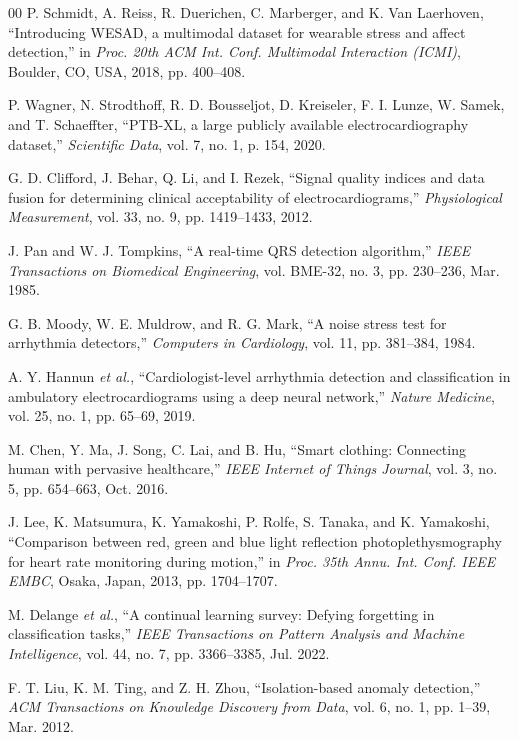 \documentclass{ieeeaccess}
\begin{document}
\begin{thebibliography}{00}
P. Schmidt, A. Reiss, R. Duerichen, C. Marberger, and K. Van Laerhoven, ``Introducing WESAD, a multimodal dataset for wearable stress and affect detection,'' in \textit{Proc. 20th ACM Int. Conf. Multimodal Interaction (ICMI)}, Boulder, CO, USA, 2018, pp. 400--408.

P. Wagner, N. Strodthoff, R. D. Bousseljot, D. Kreiseler, F. I. Lunze, W. Samek, and T. Schaeffter, ``PTB-XL, a large publicly available electrocardiography dataset,'' \textit{Scientific Data}, vol. 7, no. 1, p. 154, 2020.

G. D. Clifford, J. Behar, Q. Li, and I. Rezek, ``Signal quality indices and data fusion for determining clinical acceptability of electrocardiograms,'' \textit{Physiological Measurement}, vol. 33, no. 9, pp. 1419--1433, 2012.

J. Pan and W. J. Tompkins, ``A real-time QRS detection algorithm,'' \textit{IEEE Transactions on Biomedical Engineering}, vol. BME-32, no. 3, pp. 230--236, Mar. 1985.

G. B. Moody, W. E. Muldrow, and R. G. Mark, ``A noise stress test for arrhythmia detectors,'' \textit{Computers in Cardiology}, vol. 11, pp. 381--384, 1984.

A. Y. Hannun \textit{et al.}, ``Cardiologist-level arrhythmia detection and classification in ambulatory electrocardiograms using a deep neural network,'' \textit{Nature Medicine}, vol. 25, no. 1, pp. 65--69, 2019.

M. Chen, Y. Ma, J. Song, C. Lai, and B. Hu, ``Smart clothing: Connecting human with pervasive healthcare,'' \textit{IEEE Internet of Things Journal}, vol. 3, no. 5, pp. 654--663, Oct. 2016.

J. Lee, K. Matsumura, K. Yamakoshi, P. Rolfe, S. Tanaka, and K. Yamakoshi, ``Comparison between red, green and blue light reflection photoplethysmography for heart rate monitoring during motion,'' in \textit{Proc. 35th Annu. Int. Conf. IEEE EMBC}, Osaka, Japan, 2013, pp. 1704--1707.

M. Delange \textit{et al.}, ``A continual learning survey: Defying forgetting in classification tasks,'' \textit{IEEE Transactions on Pattern Analysis and Machine Intelligence}, vol. 44, no. 7, pp. 3366--3385, Jul. 2022.

F. T. Liu, K. M. Ting, and Z. H. Zhou, ``Isolation-based anomaly detection,'' \textit{ACM Transactions on Knowledge Discovery from Data}, vol. 6, no. 1, pp. 1--39, Mar. 2012.


\end{thebibliography}
\end{document}
